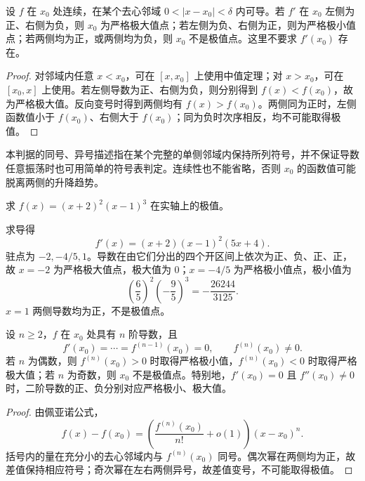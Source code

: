 \documentclass[UTF8,12pt,a4paper,fontset=fandol]{ctexbook}
\begin{document}
\begin{theorem}[极值的第一导数判别]
\label{thm:first-derivative-extremum-test}
设 $f$ 在 $x_0$ 处连续，在某个去心邻域 $0<|x-x_0|<\delta$ 内可导。若 $f'$ 在 $x_0$ 左侧为正、右侧为负，则 $x_0$ 为严格极大值点；若左侧为负、右侧为正，则为严格极小值点；若两侧均为正，或两侧均为负，则 $x_0$ 不是极值点。这里不要求 $f'(x_0)$ 存在。
\end{theorem}

\begin{proof}
对邻域内任意 $x<x_0$，可在 $[x,x_0]$ 上使用中值定理；对 $x>x_0$，可在 $[x_0,x]$ 上使用。若左侧导数为正、右侧为负，则分别得到 $f(x)<f(x_0)$，故为严格极大值。反向变号时得到两侧均有 $f(x)>f(x_0)$。两侧同为正时，左侧函数值小于 $f(x_0)$、右侧大于 $f(x_0)$；同为负时次序相反，均不可能取得极值。
\end{proof}

本判据的同号、异号描述指在某个完整的单侧邻域内保持所列符号，并不保证导数任意振荡时也可用简单的符号表判定。连续性也不能省略，否则 $x_0$ 的函数值可能脱离两侧的升降趋势。

\begin{example}
\label{ex:polynomial-stationary-point-classification}
求 $f(x)=(x+2)^2(x-1)^3$ 在实轴上的极值。
\end{example}

\begin{solve}
求导得
\[
    f'(x)=(x+2)(x-1)^2(5x+4).
\]
驻点为 $-2,-4/5,1$。导数在由它们分出的四个开区间上依次为正、负、正、正，故 $x=-2$ 为严格极大值点，极大值为 $0$；$x=-4/5$ 为严格极小值点，极小值为
\[
    \left(\frac65\right)^2\left(-\frac95\right)^3
    =-\frac{26244}{3125}.
\]
$x=1$ 两侧导数均为正，不是极值点。
\end{solve}

\begin{theorem}[极值的高阶导数判别]
\label{thm:higher-derivative-extremum-test}
设 $n\geq2$，$f$ 在 $x_0$ 处具有 $n$ 阶导数，且
\[
    f'(x_0)=\cdots=f^{(n-1)}(x_0)=0,
    \qquad f^{(n)}(x_0)\neq0.
\]
若 $n$ 为偶数，则 $f^{(n)}(x_0)>0$ 时取得严格极小值，$f^{(n)}(x_0)<0$ 时取得严格极大值；若 $n$ 为奇数，则 $x_0$ 不是极值点。特别地，$f'(x_0)=0$ 且 $f''(x_0)\neq0$ 时，二阶导数的正、负分别对应严格极小、极大值。
\end{theorem}

\begin{proof}
由佩亚诺公式，
\[
    f(x)-f(x_0)
    =\left(\frac{f^{(n)}(x_0)}{n!}+o(1)\right)(x-x_0)^n.
\]
括号内的量在充分小的去心邻域内与 $f^{(n)}(x_0)$ 同号。偶次幂在两侧均为正，故差值保持相应符号；奇次幂在左右两侧异号，故差值变号，不可能取得极值。
\end{proof}
\end{document}

